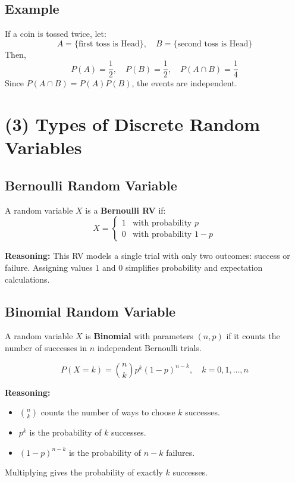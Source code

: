 \documentclass[11pt]{article}
\begin{document}
\subsection*{Example}
If a coin is tossed twice, let:
\[
A = \{\text{first toss is Head}\}, \quad B = \{\text{second toss is Head}\}
\]
Then,
\[
P(A) = \frac{1}{2}, \quad P(B) = \frac{1}{2}, \quad P(A \cap B) = \frac{1}{4}
\]
Since $P(A \cap B) = P(A)P(B)$, the events are independent.

\section*{(3) Types of Discrete Random Variables}

\subsection*{Bernoulli Random Variable}

A random variable $X$ is a \textbf{Bernoulli RV} if:
\[
X =
\begin{cases}
1 & \text{with probability } p \\
0 & \text{with probability } 1-p
\end{cases}
\]

\textbf{Reasoning:}  
This RV models a single trial with only two outcomes: success or failure. Assigning values $1$ and $0$ simplifies probability and expectation calculations.

\subsection*{Binomial Random Variable}

A random variable $X$ is \textbf{Binomial} with parameters $(n, p)$ if it counts the number of successes in $n$ independent Bernoulli trials.

\[
P(X = k) = \binom{n}{k} p^k (1-p)^{n-k}, \quad k = 0,1,\dots,n
\]

\textbf{Reasoning:}  
\begin{itemize}
    \item $\binom{n}{k}$ counts the number of ways to choose $k$ successes.
    \item $p^k$ is the probability of $k$ successes.
    \item $(1-p)^{n-k}$ is the probability of $n-k$ failures.
\end{itemize}

Multiplying gives the probability of exactly $k$ successes.
\end{document}
